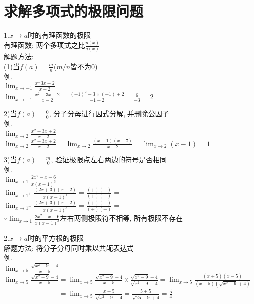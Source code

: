 \chapter{求解多项式的极限问题}
1.$x\to a$时的有理函数的极限\\
有理函数: 两个多项式之比$\frac{p(x)}{q(x)}$\\
解题方法:\\
(1)当$f(a)=\frac{m}{n}$($m/n$皆不为0)\\
例.\\
\phantom{例}$\displaystyle\lim_{x\to -1}\frac{x^-3x+2}{x-2}$\\
$\displaystyle\lim_{x\to -1}\frac{x^2-3x+2}{x-2}=\frac{(-1)^2-3\times(-1)+2}{-1-2}=\frac{6}{-3}=2$\\\vspace{1ex}

2)当$f(a)=\frac{0}{0}$, 分子分母进行因式分解, 并删除公因子\\
例.\\
\phantom{例}$\displaystyle\lim_{x\to 2}\frac{x^2-3x+2}{x-2}$\\
$\displaystyle\lim_{x\to 2}\frac{x^2-3x+2}{x-2}=\lim_{x\to 2}\frac{(x-1)(x-2)}{x-2}=\lim_{x\to 2}(x-1)=1$\\\vspace{1ex}

3)当$f(a)=\frac{m}{0}$, 验证极限点左右两边的符号是否相同\\
例.\\
\phantom{例}$\displaystyle\lim_{x\to 1}\frac{2x^2-x-6}{x(x-1)^3}$\\
$\displaystyle\lim_{x\to 1^+}\frac{(2x+3)(x-2)}{x(x-1)^3}=\frac{(+)(-)}{(+)(+)}=-$\\
$\displaystyle\lim_{x\to 1^-}\frac{(2x+3)(x-2)}{x(x-1)^3}=\frac{(+)(-)}{(+)(-)}=+$\\
$\displaystyle\because\lim_{x\to 1}\frac{2x^2-x-6}{x(x-1)^3}$左右两侧极限符不相等, 所有极限不存在\\\vspace{4ex}

2.$x\to a$时的平方根的极限\\
解题方法: 将分子分母同时乘以共轭表达式\\
例.\\
\phantom{例}$\displaystyle\lim_{x\to 5}\frac{\sqrt{x^2-9}-4}{x-5}$\\
$\displaystyle\lim_{x\to 5}\frac{\sqrt{x^2-9}-4}{x-5}=\lim_{x\to 5}\frac{\sqrt{x^2-9}-4}{x-5}\times\frac{\sqrt{x^2-9}+4}{\sqrt{x^2-9}+4}=\lim_{x\to 5}\frac{(x+5)(x-5)}{(x-5)(\sqrt{x^2-9}+4)}$\\
$\displaystyle\phantom{\lim_{x\to 5}\frac{\sqrt{x^2-9}-4}{x-5}}=\lim_{x\to 5}\frac{x+5}{\sqrt{x^2-9}+4}=\frac{5+5}{\sqrt{25-9}+4}=\frac{5}{4}$\\\vspace{4ex}

